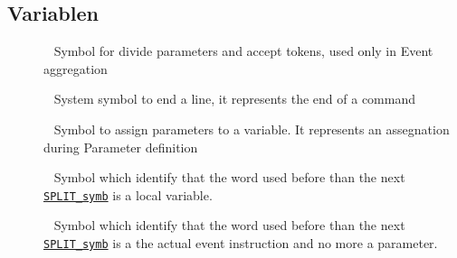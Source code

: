 \subsection{Variablen}
\begin{description}
\item[{\label{ontologyFramework.OFEventManagement.OFLogicalEventManagement.OFEventBuilder.ASSEGNATION_symb}}]
~ Symbol for divide parameters and accept tokens, used only in Event aggregation
\item[{\label{ontologyFramework.OFEventManagement.OFLogicalEventManagement.OFEventBuilder.ENDLine_symb}}]
~ System symbol to end a line, it represents the end of a command
\item[{\label{ontologyFramework.OFEventManagement.OFLogicalEventManagement.OFEventBuilder.ASSEGNATIONPARAMETER_symb}}]
~ Symbol to assign parameters to a variable. It represents an assegnation during Parameter definition
\item[{\label{ontologyFramework.OFEventManagement.OFLogicalEventManagement.OFEventBuilder.VARIABLE_symb}}]
~ Symbol which identify that the word used before than the next \texttt{\hyperlink{ontologyFramework.OFEventManagement.OFLogicalEventManagement.OFEventBuilder.SPLIT_symb}{SPLIT_symb}} 
 is a local variable.
\item[{\label{ontologyFramework.OFEventManagement.OFLogicalEventManagement.OFEventBuilder.RETURN_symb}}]
~ Symbol which identify that the word used before than the next \texttt{\hyperlink{ontologyFramework.OFEventManagement.OFLogicalEventManagement.OFEventBuilder.SPLIT_symb}{SPLIT_symb}} 
 is a the actual event instruction and no more a parameter.
\item[{\label{ontologyFramework.OFEventManagement.OFLogicalEventManagement.OFEventBuilder.ATONTOLOGY_symb}}]

\end{description}
